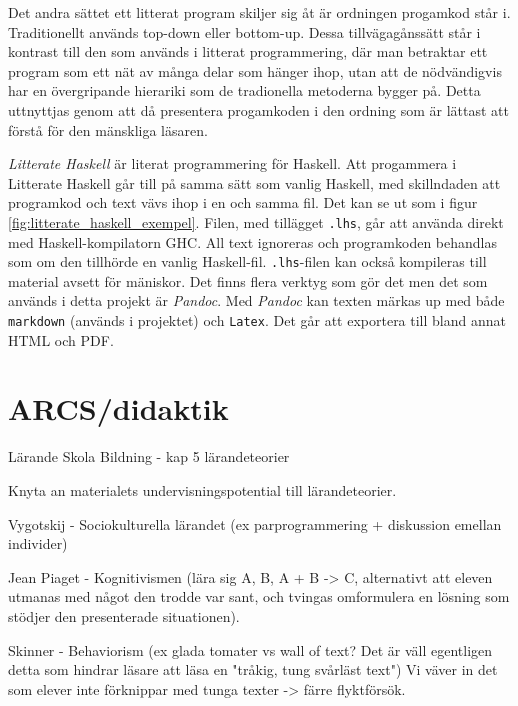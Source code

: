 \begin{draft}
Det andra sättet ett litterat program skiljer sig åt är ordningen progamkod
står i. Traditionellt används top-down eller bottom-up. Dessa tillvägagånssätt
står i kontrast till den som används i litterat programmering, där man
betraktar ett program som ett nät av många delar som hänger ihop, utan att de
nödvändigvis har en övergripande hierariki som de tradionella metoderna bygger
på. Detta uttnyttjas genom att då presentera progamkoden i den ordning som är
lättast att förstå för den mänskliga läsaren.

\textit{Litterate Haskell} är literat programmering för Haskell.\cite{litterate_haskell}
Att progammera i Litterate Haskell går till på samma sätt som vanlig Haskell,
med skillndaden att programkod och text vävs ihop i en och samma fil. Det kan
se ut som i figur \ref{fig:litterate_haskell_exempel}. Filen, med tillägget
\texttt{.lhs}, går att använda direkt med Haskell-kompilatorn GHC. All text
ignoreras och programkoden behandlas som om den tillhörde en vanlig
Haskell-fil. \texttt{.lhs}-filen kan också kompileras till material avsett för
mäniskor. Det finns flera verktyg som gör det men det som används i detta
projekt är \textit{Pandoc}\cite{pandoc}. Med \textit{Pandoc} kan texten märkas
up med både \texttt{markdown} (används i projektet) och \texttt{Latex}. Det går
att exportera till bland annat HTML och PDF.  \end{draft}

\section{ARCS/didaktik}
\label{sec:arcs}


\begin{binge}

Lärande Skola Bildning - kap 5 lärandeteorier

Knyta an materialets undervisningspotential till lärandeteorier.

Vygotskij - Sociokulturella lärandet (ex parprogrammering + diskussion emellan individer)

Jean Piaget - Kognitivismen (lära sig A, B, A + B -> C, alternativt att eleven utmanas med något den trodde var sant, och tvingas omformulera en lösning som stödjer den presenterade situationen).

Skinner - Behaviorism (ex glada tomater vs wall of text? Det är väll egentligen detta som hindrar läsare att läsa en "tråkig, tung svårläst text")
Vi väver in det som elever inte förknippar med tunga texter -> färre flyktförsök.

\end{binge}
